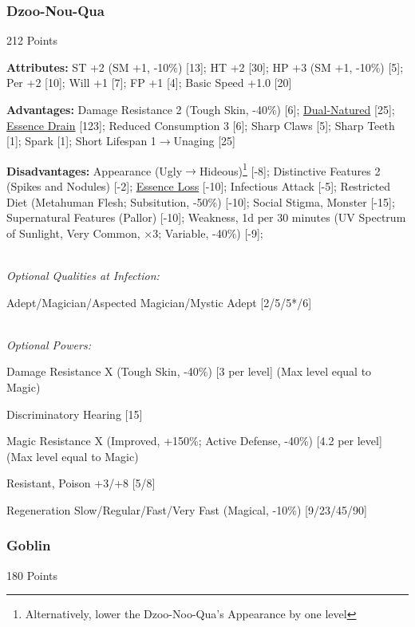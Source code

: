\begin{multicols*}{3}
	\subsubsection{Dzoo-Nou-Qua}\label{dzoo-noo-qua}
	\begin{flushright}
		212 Points
	\end{flushright}
	
	\textbf{Attributes:}
	ST +2 (SM +1, -10\%) [13]; HT +2 [30]; HP +3 (SM +1, -10\%) [5]; Per +2 [10]; Will +1 [7]; FP +1 [4]; Basic Speed +1.0 [20]
	
	\textbf{Advantages:}
	Damage Resistance 2 (Tough Skin, -40\%) [6]; \hyperref[dual_natured]{Dual-Natured} [25];  \hyperref[essence_drain]{Essence Drain} [123]; Reduced Consumption 3 [6]; Sharp Claws [5]; Sharp Teeth [1]; Spark [1]; Short Lifespan 1$\rightarrow$Unaging [25]
	
	\textbf{Disadvantages:}	
	Appearance (Ugly$\rightarrow$Hideous)\footnote{Alternatively, lower the Dzoo-Noo-Qua's Appearance by one level} [-8]; Distinctive Features 2 (Spikes and Nodules) [-2]; \hyperref[essence_loss]{Essence Loss} [-10]; Infectious Attack [-5]; Restricted Diet (Metahuman Flesh; Subsitution, -50\%) [-10]; Social Stigma, Monster [-15]; Supernatural Features (Pallor) [-10]; Weakness, 1d per 30 minutes (UV Spectrum of Sunlight, Very Common, $\times$3; Variable, -40\%) [-9];
	
	\textit{\\Optional Qualities at Infection:}
	
	Adept/Magician/Aspected Magician/Mystic Adept [2/5/5*/6]
	
	\textit{\\Optional Powers:}
	
	Damage Resistance X (Tough Skin, -40\%) [3 per level] (Max level equal to Magic)
	
	Discriminatory Hearing [15]
		
	Magic Resistance X (Improved, +150\%; Active Defense, -40\%) [4.2 per level] (Max level equal to Magic)
	
	Resistant, Poison +3/+8 [5/8]
	
	Regeneration Slow/Regular/Fast/Very Fast (Magical, -10\%) [9/23/45/90]	

	\subsubsection{Goblin}\label{goblin}
	\begin{flushright}
		180 Points
	\end{flushright}


\end{multicols*}
